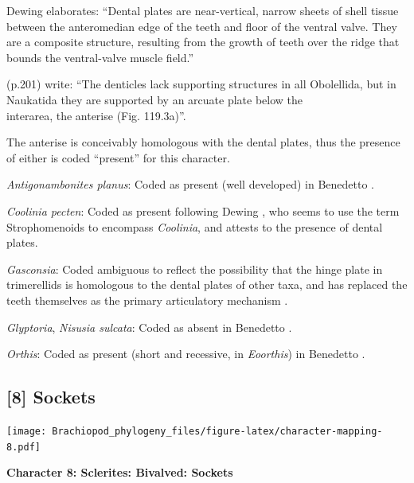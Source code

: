 \documentclass[openany]{book}
\theoremstyle{definition}
\theoremstyle{definition}
\theoremstyle{definition}
\theoremstyle{remark}
\begin{document}
Dewing \citeyearpar{Dewing2001Hingemodifications} elaborates: ``Dental
plates are near-vertical, narrow sheets of shell tissue between the
anteromedian edge of the teeth and floor of the ventral valve. They are
a composite structure, resulting from the growth of teeth over the ridge
that bounds the ventral-valve muscle field.''

\citet{Williams2000LinguliformeaCraniiformea} (p.201) write: ``The
denticles lack supporting structures in all Obolellida, but in Naukatida
they are supported by an arcuate plate below the\\
interarea, the anterise (Fig. 119.3a)''.

The anterise is conceivably homologous with the dental plates, thus the
presence of either is coded ``present'' for this character.

\hypertarget{Antigonambonites_planus-coding-7}{}
\emph{Antigonambonites planus}: Coded as present (well developed) in
Benedetto \citeyearpar{Benedetto2009iChaniella}.

\hypertarget{Coolinia_pecten-coding-7}{}
\emph{Coolinia pecten}: Coded as present following Dewing
\citeyearpar{Dewing2001Hingemodifications}, who seems to use the term
Strophomenoids to encompass \emph{Coolinia}, and attests to the presence
of dental plates.

\hypertarget{Gasconsia-coding-7}{}
\emph{Gasconsia}: Coded ambiguous to reflect the possibility that the
hinge plate in trimerellids is homologous to the dental plates of other
taxa, and has replaced the teeth themselves as the primary articulatory
mechanism \citep[see][p.~184, for details of the
articulation]{Williams2000LinguliformeaCraniiformea}.

\hypertarget{Glyptoria-coding-7}{}
\emph{Glyptoria}, \emph{Nisusia sulcata}: Coded as absent in Benedetto
\citeyearpar{Benedetto2009iChaniella}.

\hypertarget{Orthis-coding-7}{}
\emph{Orthis}: Coded as present (short and recessive, in
\emph{Eoorthis}) in Benedetto \citeyearpar{Benedetto2009iChaniella}.

\subsection*{{[}8{]} Sockets}\label{sockets}

\texttt{[image: Brachiopod\_phylogeny\_files/figure-latex/character-mapping-8.pdf]}

\textbf{Character 8: Sclerites: Bivalved: Sockets}
\end{document}
